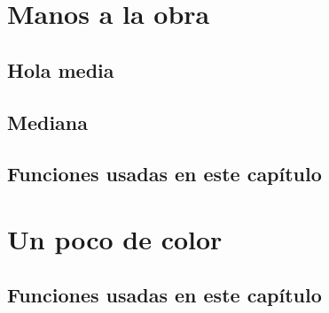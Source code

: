 \documentclass[openany,a4paper]{book}
\begin{document}
\chapter{Manos a la obra}

\section{Hola media}

\section{Mediana}

\section*{Funciones usadas en este capítulo}

\chapter{Un poco de color}

\section*{Funciones usadas en este capítulo}
\end{document}
